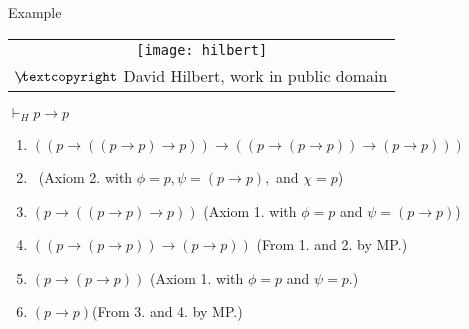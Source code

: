 \begin{frame}{Example}

\begin{center}
		\begin{tabular}{c}
		\texttt{[image: hilbert]}\\[-1ex]
		{\tiny $\not\hspace{-1ex}\textcopyright$ David Hilbert, work in public domain}
		\end{tabular}
		\vspace{2ex}
		
		$\vdash_H p\to p$
		\end{center}
		
		
			\begin{enumerate}[1.] 

	\item $((p \to ((p \to p) \to p)) \to ((p \to (p \to p)) \to (p \to p)))$ 

	\item[] \ \hfill (Axiom 2. with $\phi=p, \psi=(p\to p),$ and $\chi=p$)

	\item $(p \to ((p \to p) \to p))$ \hfill (Axiom 1. with $\phi=p$ and $\psi=(p\to p)$)

	\item $((p \to (p \to p)) \to (p \to p))$ \hfill (From 1. and 2. by MP.)

	\item $(p \to (p \to p))$ \hfill (Axiom 1. with $\phi=p$ and $\psi=p$.)

	\item $(p \to p)$\hfill (From 3. and 4. by MP.)

\end{enumerate}

\end{frame}

